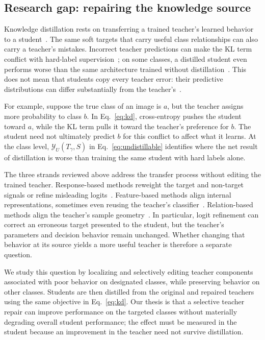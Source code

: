 \documentclass[review,number,sort&compress]{elsarticle}
\theoremstyle{definition}
\begin{document}
\subsection{Research gap: repairing the knowledge source}
\label{sec:research-gap}

Knowledge distillation rests on transferring a trained teacher's learned
behavior to a student~\citep{hinton2015distilling,gou2021knowledge}. The same
soft targets that carry useful class relationships can also carry a teacher's
mistakes. Incorrect teacher predictions can make the KL term conflict with
hard-label supervision~\citep{sun2025knowledge}; on some classes, a distilled
student even performs worse than the same architecture trained without
distillation~\citep{zhu2022teach}. This does not mean that students copy every
teacher error: their predictive distributions can differ substantially from
the teacher's~\citep{nagarajan2023student}.

For example, suppose the true class of an image is $a$, but the teacher assigns
more probability to class $b$. In Eq.~\eqref{eq:kd}, cross-entropy pushes the
student toward $a$, while the KL term pulls it toward the teacher's preference
for $b$. The student need not ultimately predict $b$ for this conflict to
affect what it learns. At the class level,
$\mathcal{Y}_U(T_\gamma,S)$ in Eq.~\eqref{eq:undistillable} identifies where
the net result of distillation is worse than training the same student with
hard labels alone.

The three strands reviewed above address the transfer process without editing
the trained teacher. Response-based methods reweight the target and non-target
signals or refine misleading logits~\citep{zhao2022decoupled,sun2025knowledge}.
Feature-based methods align internal representations, sometimes even reusing
the teacher's classifier~\citep{chen2022reused}. Relation-based methods align
the teacher's sample geometry~\citep{park2019relational}. In particular, logit
refinement can correct an erroneous target presented to the student, but the
teacher's parameters and decision behavior remain unchanged. Whether changing
that behavior at its source yields a more useful teacher is therefore a
separate question.

We study this question by localizing and selectively editing teacher
components associated with poor behavior on designated classes, while
preserving behavior on other classes. Students are then distilled from the
original and repaired teachers using the same objective in Eq.~\eqref{eq:kd}.
Our thesis is that a selective teacher repair can improve performance on the
targeted classes without materially degrading overall student performance;
the effect must be measured in the student because an improvement in the
teacher need not survive distillation.
\end{document}
